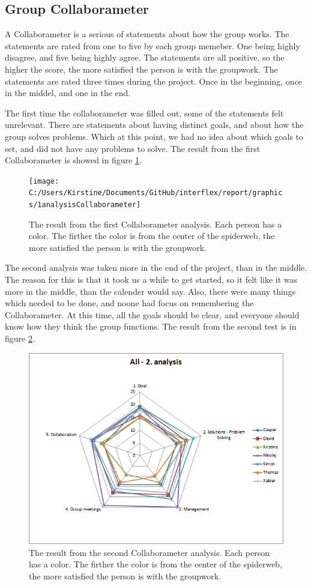 \subsection{Group Collaborameter}
A Collaborameter is a serious of statements about how the group works. The statements are rated from one to five by each group memeber. One being highly disagree, and five being highly agree. The statements are all positive, so the higher the score, the more satisfied the person is with the groupwork. The statements are rated three times during the project. Once in the beginning, once in the middel, and one in the end. 

The first time the collaborameter was filled out, some of the statements felt unrelevant. There are statements about having distinct goals, and about how the group solves problems. Which at this point, we had no idea about which goals to set, and did not have any problems to solve. The result from the first Collaborameter is showed in figure \ref{fig:1analysisCollaborameter}.

\begin{figure}
\centering
\texttt{[image: C:/Users/Kirstine/Documents/GitHub/interflex/report/graphics/1analysisCollaborameter]}
\caption{The result from the first Collaborameter analysis. Each person has a color. The firther the color is from the center of the spiderweb, the more satisfied the person is with the groupwork.}
\label{fig:1analysisCollaborameter}
\end{figure}


The second analysis was taken more in the end of the project, than in the middle. The reason for this is that it took us a while to get started, so it felt like it was more in the middle, than the calender would say. Also, there were many things which needed to be done, and noone had focus on remembering the Collaborameter. At this time, all the goals should be clear, and everyone should know how they think the group functions. The result from the second test is in figure \ref{fig:2analysisCollaborameter}.

\begin{figure}
\centering
\includegraphics[width=0.7\linewidth]{./graphics/2analysisCollaborameter}
\caption{The result from the second Collaborameter analysis. Each person has a color. The firther the color is from the center of the spiderweb, the more satisfied the person is with the groupwork.}
\label{fig:2analysisCollaborameter}
\end{figure}

